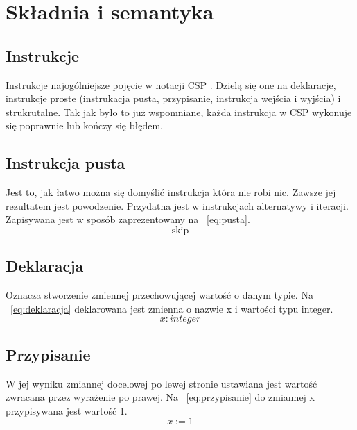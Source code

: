 \documentclass[a4paper]{report}
\begin{document}
  \chapter{Składnia i semantyka}

  \section{Instrukcje}
  Instrukcje najogólniejsze pojęcie w notacji CSP .
  Dzielą się one na deklaracje, instrukcje proste (instrukacja pusta, przypisanie, instrukcja wejścia i wyjścia) i strukrutalne.
  Tak jak było to już wspomniane, każda instrukcja w CSP wykonuje się poprawnie lub kończy się błędem.

  \section{Instrukcja pusta}
  Jest to, jak łatwo można się domyślić instrukcja która nie robi nic.
  Zawsze jej rezultatem jest powodzenie.
  Przydatna jest w instrukcjach alternatywy i iteracji.
  Zapisywana jest w sposób zaprezentowany na ~\ref{eq:pusta}.
  \begin{equation}
    \label{eq:pusta}
    \text{skip}
  \end{equation}

  \section{Deklaracja}
  Oznacza stworzenie zmiennej przechowującej wartość o danym typie.
  Na ~\ref{eq:deklaracja} deklarowana jest zmienna o nazwie x i wartości typu integer.
  \begin{equation}
    \label{eq:deklaracja}
    x: integer
  \end{equation}

  \section{Przypisanie}
  W jej wyniku zmiannej docelowej po lewej stronie ustawiana jest wartość zwracana przez wyrażenie po prawej.
  Na ~\ref{eq:przypisanie} do zmiannej x przypisywana jest wartość 1.
  \begin{equation}
    \label{eq:przypisanie}
    x := 1
  \end{equation}
\end{document}
